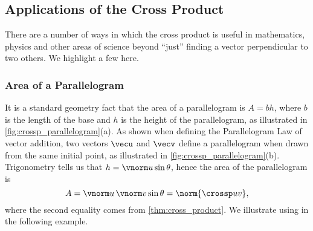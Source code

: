 \subsection*{Applications of the Cross Product}

There are a number of ways in which the cross product is useful in mathematics, physics and other areas of science beyond ``just'' finding a vector perpendicular to two others. We highlight a few here.

\subsubsection*{Area of a Parallelogram}


It is a standard geometry fact that the area of a parallelogram is $A = bh$, where $b$ is the length of the base and $h$ is the height of the parallelogram, as illustrated in \autoref{fig:crossp_parallelogram}(a). As shown when defining the Parallelogram Law of vector addition, two vectors $\vecu$ and $\vecv$ define a parallelogram when drawn from the same initial point, as illustrated in \autoref{fig:crossp_parallelogram}(b). Trigonometry tells us that $h = \vnorm u \sin \theta$, hence the area of the parallelogram is 
\begin{equation}A = \vnorm u\,\vnorm v\sin\theta = \norm{\crossp uv},\label{eq:crossp1}\end{equation}
where the second equality comes from \autoref{thm:cross_product}.
We illustrate using  in the following example.

